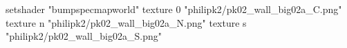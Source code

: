 setshader "bumpspecmapworld"
    texture 0 "philipk2/pk02_wall_big02a_C.png"
    texture n "philipk2/pk02_wall_big02a_N.png"
    texture s "philipk2/pk02_wall_big02a_S.png"
